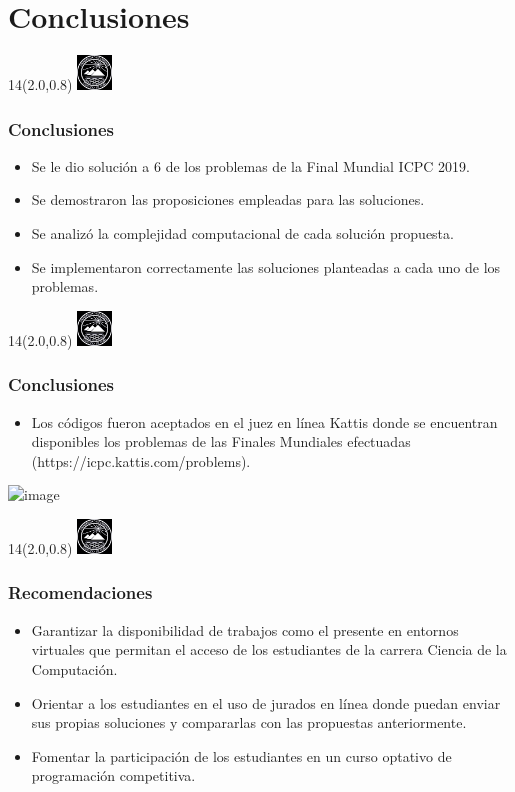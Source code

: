 \documentclass[10pt,xcolor=tables,{dvipsnames}]{beamer}
\newcommand{\MyLogo}{%
	\begin{textblock}{14}(2.0,0.8)
		\includegraphics[height=0.925cm, angle=0]{UOWhite}
	\end{textblock}
}
\begin{document}
\section{Conclusiones}
   
   \begin{frame}
   	\MyLogo
   	\frametitle{Conclusiones}
   	\begin{itemize}
   		\item<1->  Se le dio solución a 6 de los problemas de la Final Mundial ICPC 2019.\\[0.5cm]
   		\item<2-> Se demostraron las proposiciones empleadas para las soluciones.\\[0.5cm]
   		\item<3-> Se analizó la complejidad computacional de cada solución propuesta.\\[0.5cm]
   		\item<4-> Se implementaron correctamente las soluciones planteadas a cada uno de los problemas.
   	\end{itemize}
   \end{frame}
   
      \begin{frame}
      	\MyLogo
      	\frametitle{Conclusiones}
      	\begin{itemize}
      		\item<1-> Los códigos fueron aceptados en el juez en línea Kattis donde se encuentran disponibles los problemas de las Finales Mundiales efectuadas (https://icpc.kattis.com/problems).\\
      	\end{itemize}
      	\hspace{-0.6cm}\includegraphics<1->[scale=0.34]{Kattis}
      \end{frame}   
 
 \begin{frame}
 	\MyLogo
 	\frametitle{Recomendaciones}
 	\begin{itemize}
 		\item<1->  Garantizar la disponibilidad de trabajos como el presente en entornos virtuales que permitan el acceso de los estudiantes de la carrera Ciencia de la Computación.\\[0.5cm]
 		\item<2->  Orientar a los estudiantes en el uso de jurados en línea donde puedan enviar sus propias soluciones y compararlas con las propuestas anteriormente.\\[0.5cm]
 		\item<3-> Fomentar la participación de los estudiantes en un curso optativo de programación competitiva.
 	\end{itemize}
 \end{frame}     

	{
		
	}
			
			
		
\end{document}
